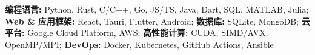 \textbf{编程语言:}
  Python,
  Rust,
  C/C++,
  Go,
  JS/TS,
  Java,
  Dart,
  SQL,
  MATLAB,
  Julia;
\textbf{Web \& 应用框架:}
  React,
  Tauri,
  Flutter,
  Android;
\textbf{数据库:}
  SQLite,
  MongoDB;
\textbf{云平台:}
  Google Cloud Platform,
  AWS;
\textbf{高性能计算:}
  CUDA,
  SIMD/AVX,
  OpenMP/MPI;
\textbf{DevOps:}
  Docker,
  Kubernetes,
  GitHub Actions,
  Ansible
